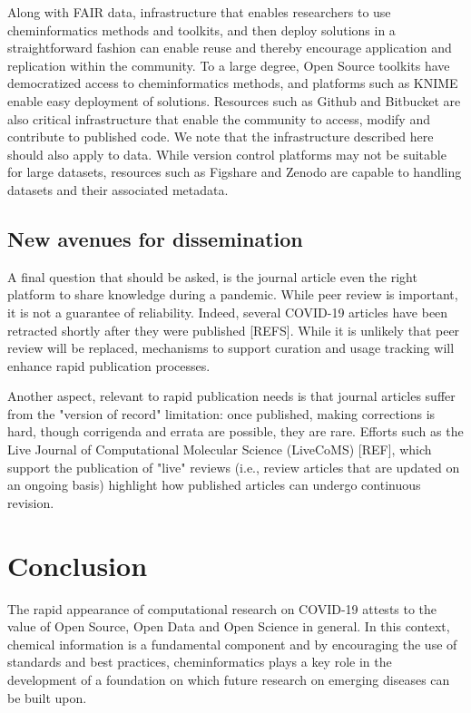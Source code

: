 \documentclass{bmcart}
\begin{document}
Along with FAIR data, infrastructure that enables researchers to use
cheminformatics methods and toolkits, and then deploy solutions in a
straightforward fashion can enable reuse and thereby encourage
application and replication within the community. To a large degree,
Open Source toolkits have democratized access to cheminformatics
methods, and platforms such as KNIME enable easy deployment of
solutions. Resources such as Github and Bitbucket are also critical
infrastructure that enable the community to access, modify and
contribute to published code. We note that the infrastructure
described here should also apply to data. While version control
platforms may not be suitable for large datasets, resources such as
Figshare and Zenodo are capable to handling datasets and their
associated metadata.


\subsection*{New avenues for dissemination}

A final question that should be asked, is the journal article even the
right platform to share knowledge during a pandemic. While peer review
is important, it is not a guarantee of reliability. Indeed, several
COVID-19 articles have been retracted shortly after they were
published [REFS]. While it is unlikely that peer review will be
replaced, mechanisms to support curation and usage tracking will
enhance rapid publication processes.

Another aspect, relevant to rapid publication needs is that journal
articles suffer from the "version of record" limitation: once
published, making corrections is hard, though corrigenda and errata
are possible, they are rare. Efforts such as the Live Journal of
Computational Molecular Science (LiveCoMS) [REF], which support the
publication of "live" reviews (i.e., review articles that are updated
on an ongoing basis) highlight how published articles can undergo
continuous revision.


\section*{Conclusion}

The rapid appearance of computational research on COVID-19 attests
to the value of Open Source, Open Data and Open Science in
general. In this context, chemical information is a fundamental
component and by encouraging the use of standards and best practices,
cheminformatics plays a key role in the development of a foundation on
which future research on emerging diseases can be built upon.
\end{document}
